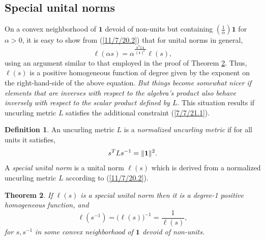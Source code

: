 \documentclass{amsart}
\numberwithin{equation}{section}
\newtheorem{theorem}{Theorem}
\theoremstyle{definition}
\newtheorem{definition}[theorem]{Definition}
\numberwithin{theorem}{section}
\begin{document}
\subsection{Special unital norms}

On a convex neighborhood of $\mathbf{1}$ devoid of non-units but containing $\left(\frac{1}{\alpha}\right)\mathbf{1}$ for $\alpha>0$, it is easy to show from (\ref{11/7/20.2}) that for unital norms in general, \[  \ell(\alpha s) = \alpha^{\frac{\mathbf{1}^T L \mathbf{1}}{\|\mathbf{1}\|^2}} \ell(s),\] using an argument similar to that employed in the proof of Theorem \ref{9/24/23.1}. Thus, $ \ell(s)$ is a positive homogeneous function of degree given by the exponent on the right-hand-side of the above equation.  
   {\it But things become somewhat nicer if elements that are inverses with respect to the algebra's product also behave inversely with respect to the scalar product defined by $L$}.  
    This situation results if uncurling metric $L$ satisfies the additional constraint (\ref{7/7/21.1}).
 
\begin{definition}\label{9/20/23.1} An uncurling metric $L$ is a {\it normalized uncurling metric} if for all units it satisfies, \begin{equation} \label{7/7/21.1} s^TLs^{-1} =\|{\bf 1}\|^2.\end{equation}  A {\it special unital norm} is a unital norm $ \ell(s)$ which is derived from a normalized uncurling metric $L$ according to (\ref{11/7/20.2}). 
\end{definition}

\begin{theorem}\label{9/24/23.1} If $ \ell(s)$ is a special unital norm then it is a degree-1 positive homogeneous function, and
\begin{equation}\label{5/23/23.3}  \ell(s^{-1}) = \big(\ell(s)\big)^{-1} = \frac{1}{\ell(s)}, \end{equation} for $s,s^{-1}$ in some convex neighborhood of $\mathbf{1}$ devoid of non-units. \end{theorem}
\end{document}
